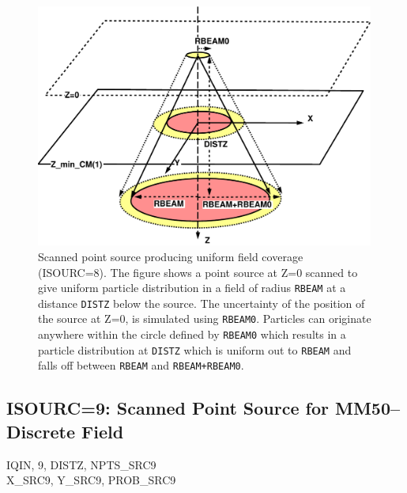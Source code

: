 \documentclass[12pt,twoside]{article}
\newcommand{\cen}[1]{\begin{center} #1 \end{center}                   }
\begin{document}
\begin{figure}[htbp]
\begin{center}
\leavevmode
\mbox{}\hspace{0cm}
\includegraphics[height=8cm]{figures/src8}
\caption[ISOURC=8: Scanned circular uniform source.]
{Scanned point source producing uniform field coverage (ISOURC=8).  The figure
shows a point source at
Z=0 scanned to give uniform particle distribution in a field of radius
{\tt RBEAM} at a distance {\tt DISTZ} below the source.  The uncertainty
of the position of the source at Z=0, is simulated using {\tt RBEAM0}.
Particles can originate anywhere within the circle defined by {\tt RBEAM0}
which results in a particle distribution at {\tt DISTZ} which is uniform
out to {\tt RBEAM} and falls off between {\tt RBEAM} and {\tt RBEAM+RBEAM0}.}
\label{fig_src8}
\end{center}
\end{figure}

\clearpage

\subsection[ISOURC=9: Scanned Point Source for MM50--Discrete]{ISOURC=9: Scanned Point Source for MM50--Discrete Field}
\cen{IQIN, 9, DISTZ, NPTS\_SRC9 \\
X\_SRC9, Y\_SRC9, PROB\_SRC9}
\end{document}
